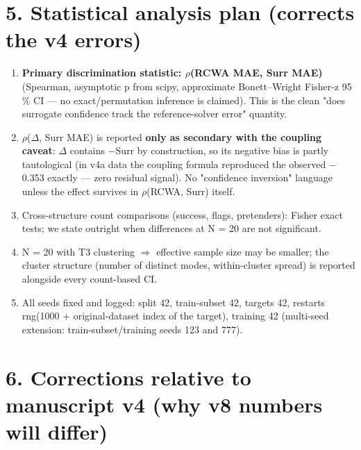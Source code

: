 \documentclass[11pt,a4paper]{article}
\providecommand{\tightlist}{\setlength{\itemsep}{0pt}\setlength{\parskip}{0pt}}
\begin{document}
\section*{5. Statistical analysis plan (corrects the v4 errors)}

\begin{enumerate}
\def\labelenumi{\arabic{enumi}.}
\tightlist
\item
  \textbf{Primary discrimination statistic: \ensuremath{\rho}(RCWA MAE, Surr MAE)} (Spearman,
  asymptotic p from scipy, approximate Bonett--Wright Fisher-z 95 \% CI ---
  no exact/permutation inference is claimed). This is the clean "does
  surrogate confidence track the reference-solver error" quantity.
\item
  \ensuremath{\rho}(\ensuremath{\Delta}, Surr MAE) is reported \textbf{only as secondary with the coupling caveat}:
  \ensuremath{\Delta} contains \ensuremath{-}Surr by construction, so its negative bias is partly
  tautological (in v4a data the coupling formula reproduced the observed
  \ensuremath{-}0.353 exactly --- zero residual signal). No "confidence inversion" language
  unless the effect survives in \ensuremath{\rho}(RCWA, Surr) itself.
\item
  Cross-structure count comparisons (success, flags, pretenders): Fisher
  exact tests; we state outright when differences at N = 20 are not
  significant.
\item
  N = 20 with T3 clustering \ensuremath{\Rightarrow} effective sample size may be smaller; the
  cluster structure (number of distinct modes, within-cluster spread) is
  reported alongside every count-based CI.
\item
  All seeds fixed and logged: split 42, train-subset 42, targets 42,
  restarts rng(1000 + original-dataset index of the target), training 42
  (multi-seed extension: train-subset/training seeds 123 and 777).
\end{enumerate}

\section*{6. Corrections relative to manuscript v4 (why v8 numbers will differ)}
\end{document}
